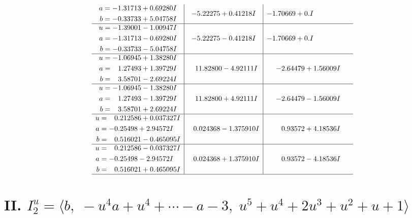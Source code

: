 \documentclass[1p]{elsarticle_modified}
\theoremstyle{definition}
\begin{document}
$$\begin{array}{c|c|c}
\begin{aligned}
a &= -1.31713 + 0.69280 I \\
b &= -0.33733 + 5.04758 I\end{aligned}
 & -5.22275 + 0.41218 I & -1.70669 + 0. I\phantom{ +0.000000I} \\ \hline\begin{aligned}
u &= -1.39001 - 1.00947 I \\
a &= -1.31713 - 0.69280 I \\
b &= -0.33733 - 5.04758 I\end{aligned}
 & -5.22275 - 0.41218 I & -1.70669 + 0. I\phantom{ +0.000000I} \\ \hline\begin{aligned}
u &= -1.06945 + 1.38280 I \\
a &= \phantom{-}1.27493 + 1.39729 I \\
b &= \phantom{-}3.58701 - 2.69224 I\end{aligned}
 & \phantom{-}11.82800 - 4.92111 I & -2.64479 + 1.56009 I \\ \hline\begin{aligned}
u &= -1.06945 - 1.38280 I \\
a &= \phantom{-}1.27493 - 1.39729 I \\
b &= \phantom{-}3.58701 + 2.69224 I\end{aligned}
 & \phantom{-}11.82800 + 4.92111 I & -2.64479 - 1.56009 I \\ \hline\begin{aligned}
u &= \phantom{-}0.212586 + 0.037327 I \\
a &= -0.25498 + 2.94572 I \\
b &= \phantom{-}0.516021 - 0.465095 I\end{aligned}
 & \phantom{-}0.024368 - 1.375910 I & \phantom{-}0.93572 + 4.18536 I \\ \hline\begin{aligned}
u &= \phantom{-}0.212586 - 0.037327 I \\
a &= -0.25498 - 2.94572 I \\
b &= \phantom{-}0.516021 + 0.465095 I\end{aligned}
 & \phantom{-}0.024368 + 1.375910 I & \phantom{-}0.93572 - 4.18536 I\\
 \hline 
 \end{array}$$\newpage\newpage\renewcommand{\arraystretch}{1}
\centering \section*{II. $I^u_{2}= \langle b,\;- u^4 a+u^4+\cdots- a-3,\;u^5+u^4+2 u^3+u^2+u+1 \rangle$}
\end{document}
